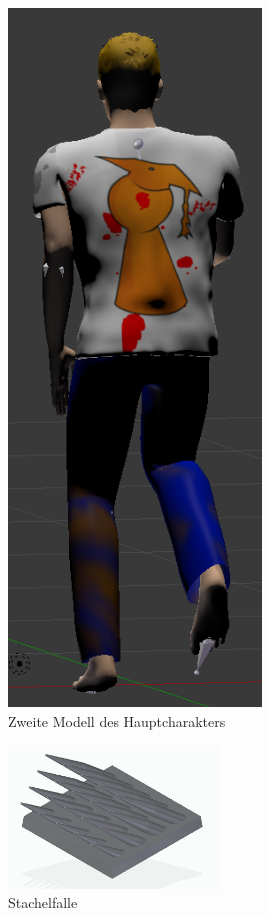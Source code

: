 \documentclass[12pt]{article}
\begin{document}
\begin{figure}
	\centering
	\includegraphics[width=0.6\textwidth]{stevevonhinten}
	\caption{Zweite Modell des Hauptcharakters
		\label{fig:highpoly}}
\end{figure}

\begin{figure}
	\centering
	\includegraphics[width=0.5\textwidth]{Stachelfalle}
	\caption{Stachelfalle
		\label{fig:spiketrap}}
\end{figure}
\end{document}
